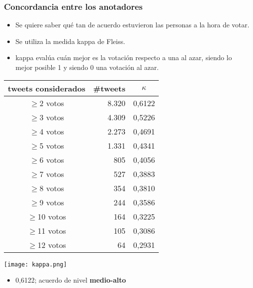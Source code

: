 \begin{frame}[allowframebreaks]
    \frametitle{Concordancia entre los anotadores}

    \begin{itemize}
        \item Se quiere saber qué tan de acuerdo estuvieron las personas a la hora de votar.
        \item Se utiliza la medida kappa de Fleiss.
        \item kappa evalúa cuán mejor es la votación respecto a una al azar, siendo lo mejor posible 1 y siendo 0 una votación al azar.
    \end{itemize}

    \framebreak

    \begin{center}
        \begin{tabular}{ c | r | c }
            tweets considerados & \#tweets & $\kappa$ \\
            \hline
            $\geq$2 votos & 8.320 & 0,6122 \\
            $\geq$3 votos & 4.309 & 0,5226 \\
            $\geq$4 votos & 2.273 & 0,4691 \\
            $\geq$5 votos & 1.331 & 0,4341 \\
            $\geq$6 votos & 805 & 0,4056 \\
            $\geq$7 votos & 527 & 0,3883 \\
            $\geq$8 votos & 354 & 0,3810 \\
            $\geq$9 votos & 244 & 0,3586 \\
            $\geq$10 votos & 164 & 0,3225 \\
            $\geq$11 votos & 105 & 0,3086 \\
            $\geq$12 votos & 64 & 0,2931 \\
        \end{tabular}

        \texttt{[image: kappa.png]}
    \end{center}

    \framebreak

    \begin{itemize}
        \item \large{0,6122; acuerdo de nivel \textbf{medio-alto}}
    \end{itemize}
\end{frame}
